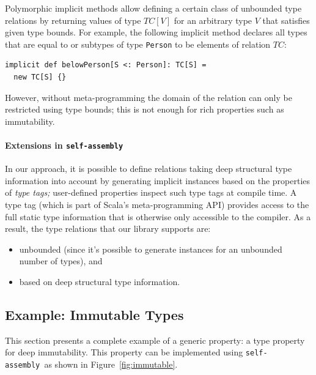\documentclass[preprint]{sigplanconf}
\newcommand{\selfassembly}{\texttt{self-assembly~}}
\begin{document}
Polymorphic implicit methods allow defining a certain class of unbounded type
relations by returning values of type $TC[V]$ for an arbitrary type $V$ that satisfies
given type bounds. For example, the following implicit method declares all types that
are equal to or subtypes of type \verb|Person| to be elements of relation $TC$:

\begin{lstlisting}
implicit def belowPerson[S <: Person]: TC[S] =
  new TC[S] {}
\end{lstlisting}
\noindent
However, without meta-programming the domain of the relation can only be
restricted using type bounds; this is not enough for rich properties such as
immutability.

\paragraph{Extensions in \selfassembly}
In our approach, it is possible to define relations taking deep
structural type information into account by generating implicit instances
based on the properties of {\em type tags;} user-defined properties inspect
such type tags at compile time. A type tag (which is part of Scala’s
meta-programming API) provides access to the full static type
information that is otherwise only accessible to the compiler. As a result,
the type relations that our library supports are:

\begin{itemize}
\item unbounded (since it’s possible to generate instances for an unbounded number of types), and
\item based on deep structural type information.
\end{itemize}


\subsection{Example: Immutable Types}\label{sec:genprop-example}



This section presents a complete example of a generic property: a type
property for deep immutability. This property can be implemented using
\selfassembly as shown in Figure~\ref{fig:immutable}.
\end{document}
